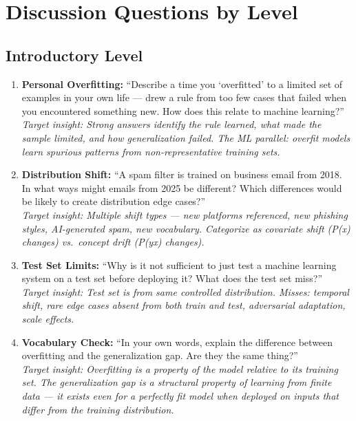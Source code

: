 \section{Discussion Questions by Level}

\subsection{Introductory Level}

\begin{enumerate}
    \item \textbf{Personal Overfitting:} ``Describe a time you `overfitted' to a limited set of examples in your own life --- drew a rule from too few cases that failed when you encountered something new. How does this relate to machine learning?''\\
    \textit{Target insight: Strong answers identify the rule learned, what made the sample limited, and how generalization failed. The ML parallel: overfit models learn spurious patterns from non-representative training sets.}

    \item \textbf{Distribution Shift:} ``A spam filter is trained on business email from 2018. In what ways might emails from 2025 be different? Which differences would be likely to create distribution edge cases?''\\
    \textit{Target insight: Multiple shift types --- new platforms referenced, new phishing styles, AI-generated spam, new vocabulary. Categorize as covariate shift (P(x) changes) vs.\ concept drift (P(y\textbar x) changes).}

    \item \textbf{Test Set Limits:} ``Why is it not sufficient to just test a machine learning system on a test set before deploying it? What does the test set miss?''\\
    \textit{Target insight: Test set is from same controlled distribution. Misses: temporal shift, rare edge cases absent from both train and test, adversarial adaptation, scale effects.}

    \item \textbf{Vocabulary Check:} ``In your own words, explain the difference between overfitting and the generalization gap. Are they the same thing?''\\
    \textit{Target insight: Overfitting is a property of the model relative to its training set. The generalization gap is a structural property of learning from finite data --- it exists even for a perfectly fit model when deployed on inputs that differ from the training distribution.}
\end{enumerate}

